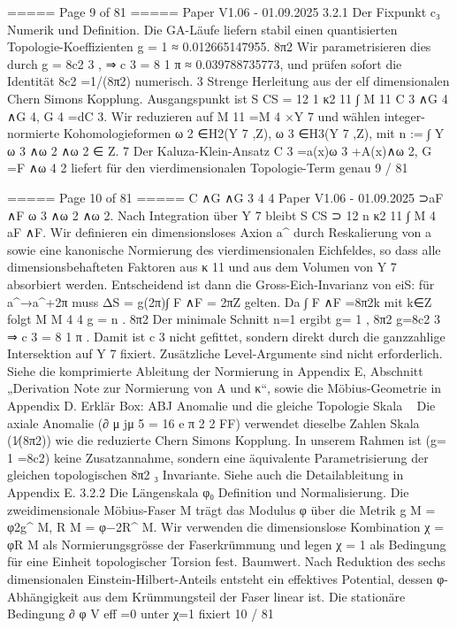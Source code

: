 \begin{MyVerbatim}
===== Page 9 of 81 =====
Paper V1.06 - 01.09.2025
3.2.1 Der Fixpunkt c₃
Numerik und Definition.
Die GA-Läufe liefern stabil einen quantisierten Topologie-Koeffizienten
g = 1 ≈ 0.012665147955.
8π2
Wir parametrisieren dies durch
g = 8c2 3 , ⇒ c 3 = 8 1 π ≈ 0.039788735773,
und prüfen sofort die Identität 8c2 =1/(8π2) numerisch.
3
Strenge Herleitung aus der elf dimensionalen Chern Simons Kopplung.
Ausgangspunkt ist
S CS = 12 1 κ2 11 ∫ M 11 C 3 ∧G 4 ∧G 4,
G 4 =dC 3.
Wir reduzieren auf M 11 =M 4 ×Y 7 und wählen integer-normierte Kohomologieformen
ω
2
∈H2(Y
7
,Z),
ω
3
∈H3(Y
7
,Z),
mit
n := ∫
Y
ω
3
∧ω
2
∧ω
2
∈ Z.
7
Der Kaluza-Klein-Ansatz
C 3 =a(x)ω 3 +A(x)∧ω 2,
G =F ∧ω
4 2
liefert für den vierdimensionalen Topologie-Term genau
9 / 81

===== Page 10 of 81 =====
C ∧G ∧G
3 4 4
Paper V1.06 - 01.09.2025
⊃aF ∧F ω 3 ∧ω 2 ∧ω 2.
Nach Integration über Y 7 bleibt
S
CS
⊃
12
n
κ2 11
∫
M 4
aF ∧F.
Wir definieren ein dimensionsloses Axion a^ durch Reskalierung von a sowie eine kanonische Normierung des
vierdimensionalen Eichfeldes, so dass alle dimensionsbehafteten Faktoren aus κ 11 und aus dem Volumen von Y 7
absorbiert werden. Entscheidend ist dann die Gross-Eich-Invarianz von eiS: für a^→a^+2π muss
ΔS = g(2π)∫ F ∧F = 2πZ gelten. Da ∫ F ∧F =8π2k mit k∈Z folgt
M M
4 4
g = n .
8π2
Der minimale Schnitt n=1 ergibt
g= 1 ,
8π2
g=8c2 3 ⇒ c 3 = 8 1 π .
Damit ist c 3 nicht gefittet, sondern direkt durch die ganzzahlige Intersektion auf Y 7 fixiert. Zusätzliche Level-Argumente
sind nicht erforderlich.
Siehe die komprimierte Ableitung der Normierung in Appendix E, Abschnitt „Derivation Note zur Normierung von
A und κ“, sowie die Möbius-Geometrie in Appendix D.
Erklär Box: ABJ Anomalie und die gleiche Topologie Skala
~
Die axiale Anomalie (∂ μ jμ 5 = 16 e π 2 2 FF) verwendet dieselbe Zahlen Skala (1∕(8π2)) wie die reduzierte Chern Simons
Kopplung. In unserem Rahmen ist
(g= 1 =8c2) keine Zusatzannahme, sondern eine äquivalente Parametrisierung der gleichen topologischen
8π2 ₃
Invariante.
Siehe auch die Detailableitung in Appendix E.
3.2.2 Die Längenskala φ₀
Definition und Normalisierung.
Die zweidimensionale Möbius-Faser M trägt das Modulus φ über die Metrik
g M = φ2g^ M,
R M = φ−2R^ M.
Wir verwenden die dimensionslose Kombination
χ = φR
M
als Normierungsgrösse der Faserkrümmung und legen
χ = 1
als Bedingung für eine Einheit topologischer Torsion fest.
Baumwert.
Nach Reduktion des sechs dimensionalen Einstein-Hilbert-Anteils entsteht ein effektives Potential, dessen φ-
Abhängigkeit aus dem Krümmungsteil der Faser linear ist. Die stationäre Bedingung ∂ φ V eff =0 unter χ=1 fixiert
10 / 81


\end{MyVerbatim}
